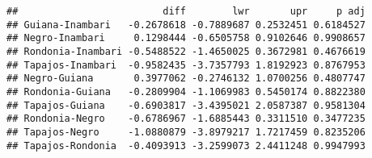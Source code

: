 \documentclass[]{article}
\newenvironment{Shaded}{\begin{snugshade}}{\end{snugshade}}
\newcommand{\CommentTok}[1]{\textcolor[rgb]{0.56,0.35,0.01}{\textit{#1}}}
\newcommand{\DataTypeTok}[1]{\textcolor[rgb]{0.13,0.29,0.53}{#1}}
\newcommand{\KeywordTok}[1]{\textcolor[rgb]{0.13,0.29,0.53}{\textbf{#1}}}
\newcommand{\NormalTok}[1]{#1}
\newcommand{\OperatorTok}[1]{\textcolor[rgb]{0.81,0.36,0.00}{\textbf{#1}}}
\newcommand{\OtherTok}[1]{\textcolor[rgb]{0.56,0.35,0.01}{#1}}
\begin{document}
\begin{Shaded}
\end{Shaded}

\begin{verbatim}
##                         diff        lwr       upr     p adj
## Guiana-Inambari   -0.2678618 -0.7889687 0.2532451 0.6184527
## Negro-Inambari     0.1298444 -0.6505758 0.9102646 0.9908657
## Rondonia-Inambari -0.5488522 -1.4650025 0.3672981 0.4676619
## Tapajos-Inambari  -0.9582435 -3.7357793 1.8192923 0.8767953
## Negro-Guiana       0.3977062 -0.2746132 1.0700256 0.4807747
## Rondonia-Guiana   -0.2809904 -1.1069983 0.5450174 0.8822380
## Tapajos-Guiana    -0.6903817 -3.4395021 2.0587387 0.9581304
## Rondonia-Negro    -0.6786967 -1.6885443 0.3311510 0.3477235
## Tapajos-Negro     -1.0880879 -3.8979217 1.7217459 0.8235206
## Tapajos-Rondonia  -0.4093913 -3.2599073 2.4411248 0.9947993
\end{verbatim}
\end{document}
